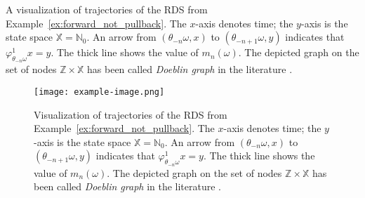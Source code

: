 \documentclass[12pt]{article}
\begin{document}
A visualization of trajectories of the RDS from Example~\ref{ex:forward_not_pullback}. The $x$-axis denotes time; the $y$-axis is the state space $\mathds{X}=\mathds{N}_0$. An arrow from $(\theta_{-n} \omega, x)$ to $(\theta_{-n+1} \omega, y)$ indicates that $\varphi_{\theta_{-n}\omega}^1 x = y$. The thick line shows the value of $m_n(\omega)$. The depicted graph on the set of nodes $\mathds{Z} \times \mathds{X}$ has been called \emph{Doeblin graph} in the literature \cite{Baccellietal2019}.

\begin{figure}[h]
    \centering
    \texttt{[image: example-image.png]} %
    \caption{Visualization of trajectories of the RDS from Example~\ref{ex:forward_not_pullback}. The $x$-axis denotes time; the $y$-axis is the state space $\mathds{X}=\mathds{N}_0$. An arrow from $(\theta_{-n} \omega, x)$ to $(\theta_{-n+1} \omega, y)$ indicates that $\varphi_{\theta_{-n}\omega}^1 x = y$. The thick line shows the value of $m_n(\omega)$. The depicted graph on the set of nodes $\mathds{Z} \times \mathds{X}$ has been called \emph{Doeblin graph} in the literature \cite{Baccellietal2019}.}
    \label{fig:example_image}
\end{figure}
\end{document}
